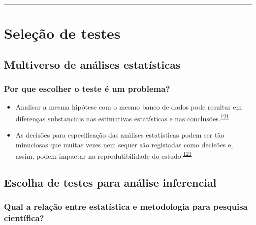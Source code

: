 \documentclass[
  a4paper,
]{book}
\begin{document}
\markboth{}{}
\par\noindent\rule{\textwidth}{0.05in}

\hypertarget{selecao-testes}{%
\chapter{\texorpdfstring{\textbf{Seleção de testes}}{Seleção de testes}}\label{selecao-testes}}

\hypertarget{multiverso-estatistica}{%
\section{Multiverso de análises estatísticas}\label{multiverso-estatistica}}

\hypertarget{por-que-escolher-o-teste-uxe9-um-problema}{%
\subsection{Por que escolher o teste é um problema?}\label{por-que-escolher-o-teste-uxe9-um-problema}}

\begin{itemize}
\item
  Analisar a mesma hipótese com o mesmo banco de dados pode resultar em diferenças substanciais nas estimativas estatísticas e nas conclusões.\textsuperscript{\protect\hyperlink{ref-Breznau2022}{121}}
\item
  As decisões para especificação das análises estatísticas podem ser tão minuciosas que muitas vezes nem sequer são registadas como decisões e, assim, podem impactar na reprodutibilidade do estudo.\textsuperscript{\protect\hyperlink{ref-Breznau2022}{121}}
\end{itemize}

\hypertarget{escolha-analise-inferencial}{%
\section{Escolha de testes para análise inferencial}\label{escolha-analise-inferencial}}

\hypertarget{qual-a-relauxe7uxe3o-entre-estatuxedstica-e-metodologia-para-pesquisa-cientuxedfica}{%
\subsection{Qual a relação entre estatística e metodologia para pesquisa científica?}\label{qual-a-relauxe7uxe3o-entre-estatuxedstica-e-metodologia-para-pesquisa-cientuxedfica}}
\end{document}
